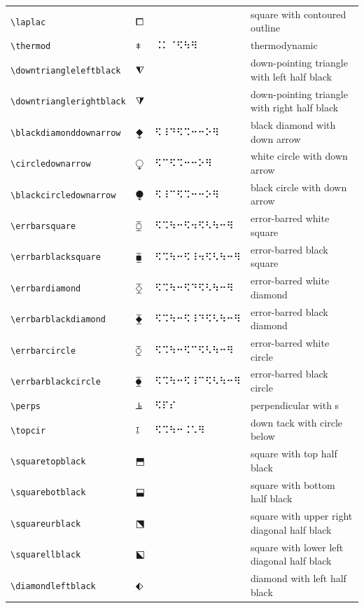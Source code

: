 \documentclass[oneside]{article}
\begin{document}
\begin{longtable}{llll}
\verb|\laplac| & $\laplac$ &    & {square with contoured outline} \\[2ex]
\verb|\thermod| & $\thermod$ &  ⠨⠅⠈⠫⠳⠻  & {thermodynamic} \\[2ex]
\verb|\downtriangleleftblack| & $\downtriangleleftblack$ &    & {down-pointing triangle with left half black} \\[2ex]
\verb|\downtrianglerightblack| & $\downtrianglerightblack$ &    & {down-pointing triangle with right half black} \\[2ex]
\verb|\blackdiamonddownarrow| & $\blackdiamonddownarrow$ &  ⠫⠸⠙⠫⠩⠒⠒⠕⠻  & {black diamond with down arrow} \\[2ex]
\verb|\circledownarrow| & $\circledownarrow$ &  ⠫⠉⠫⠩⠒⠒⠕⠻  & {white circle with down arrow} \\[2ex]
\verb|\blackcircledownarrow| & $\blackcircledownarrow$ &  ⠫⠸⠉⠫⠩⠒⠒⠕⠻  & {black circle with down arrow} \\[2ex]
\verb|\errbarsquare| & $\errbarsquare$ &  ⠫⠩⠳⠒⠫⠲⠫⠣⠳⠒⠻  & {error-barred white square} \\[2ex]
\verb|\errbarblacksquare| & $\errbarblacksquare$ &  ⠫⠩⠳⠒⠫⠸⠲⠫⠣⠳⠒⠻  & {error-barred black square} \\[2ex]
\verb|\errbardiamond| & $\errbardiamond$ &  ⠫⠩⠳⠒⠫⠙⠫⠣⠳⠒⠻  & {error-barred white diamond} \\[2ex]
\verb|\errbarblackdiamond| & $\errbarblackdiamond$ &  ⠫⠩⠳⠒⠫⠸⠙⠫⠣⠳⠒⠻  & {error-barred black diamond} \\[2ex]
\verb|\errbarcircle| & $\errbarcircle$ &  ⠫⠩⠳⠒⠫⠉⠫⠣⠳⠒⠻  & {error-barred white circle} \\[2ex]
\verb|\errbarblackcircle| & $\errbarblackcircle$ &  ⠫⠩⠳⠒⠫⠸⠉⠫⠣⠳⠒⠻  & {error-barred black circle} \\[2ex]
\verb|\perps| & $\perps$ &  ⠫⠏⠎  & {perpendicular with s} \\[2ex]
\verb|\topcir| & $\topcir$ &  ⠫⠩⠳⠒⠨⠡⠻  & {down tack with circle below} \\[2ex]
\verb|\squaretopblack| & $\squaretopblack$ &    & {square with top half black} \\[2ex]
\verb|\squarebotblack| & $\squarebotblack$ &    & {square with bottom half black} \\[2ex]
\verb|\squareurblack| & $\squareurblack$ &    & {square with upper right diagonal half black} \\[2ex]
\verb|\squarellblack| & $\squarellblack$ &    & {square with lower left diagonal half black} \\[2ex]
\verb|\diamondleftblack| & $\diamondleftblack$ &    & {diamond with left half black} \\[2ex]

\end{longtable}
\end{document}
